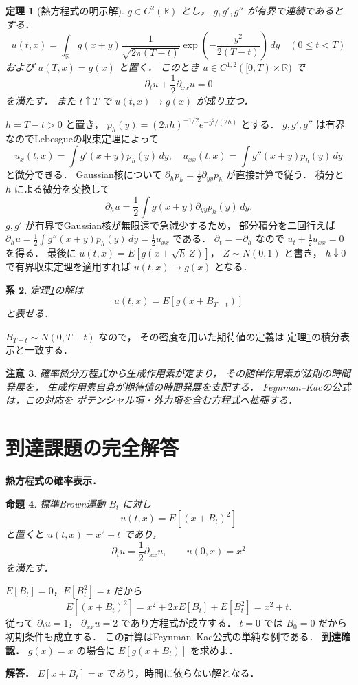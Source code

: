 \documentclass[a5paper,10pt,onecolumn]{jsarticle}
\makeatletter
\theoremstyle{mathnotetheorem}
\newtheorem{theorem}{定理}[section]
\newtheorem{proposition}[theorem]{命題}
\newtheorem{corollary}[theorem]{系}
\newtheorem{remark}[theorem]{注意}
\renewcommand{\proofname}{証明}
\renewenvironment{proof}[1][\proofname]{%
  \par\pushQED{\qed}\normalfont\topsep4\p@\@plus2\p@\relax
  \trivlist\item[\hskip\labelsep\bfseries #1]\ignorespaces
}{\popQED\endtrivlist\@endpefalse}
\makeatother
\begin{document}
\begin{theorem}[熱方程式の明示解]\label{thm:heat}
$g\in C^2(\mathbb R)$ とし，
$g,g',g''$ が有界で連続であるとする．
\[
 u(t,x)=\int_{\mathbb R}
 g(x+y)\frac{1}{\sqrt{2\pi(T-t)}}
 \exp\!\left(-\frac{y^2}{2(T-t)}\right)\,dy
 \quad(0\le t<T)
\]
および $u(T,x)=g(x)$ と置く．
このとき $u\in C^{1,2}([0,T)\times\mathbb R)$ で
\[
 \partial_tu+\frac12\partial_{xx}u=0
\]
を満たす．
また $t\uparrow T$ で $u(t,x)\to g(x)$ が成り立つ．
\end{theorem}
\begin{proof}
$h=T-t>0$ と置き，
$p_h(y)=(2\pi h)^{-1/2}e^{-y^2/(2h)}$ とする．
$g,g',g''$ は有界なのでLebesgueの収束定理によって
\[
 u_x(t,x)=\int g'(x+y)p_h(y)\,dy,\quad
 u_{xx}(t,x)=\int g''(x+y)p_h(y)\,dy
\]
と微分できる．
Gaussian核について
$\partial_hp_h=\frac12\partial_{yy}p_h$ が直接計算で従う．
積分と $h$ による微分を交換して
\[
 \partial_hu
 =\frac12\int g(x+y)\partial_{yy}p_h(y)\,dy.
\]
$g,g'$ が有界でGaussian核が無限遠で急減少するため，
部分積分を二回行えば
$\partial_hu=\frac12\int g''(x+y)p_h(y)\,dy
=\frac12u_{xx}$ である．
$\partial_t=-\partial_h$ なので
$u_t+\frac12u_{xx}=0$ を得る．
最後に $u(t,x)=E[g(x+\sqrt h\,Z)]$，
$Z\sim N(0,1)$ と書き，
$h\downarrow0$ で有界収束定理を適用すれば
$u(t,x)\to g(x)$ となる．
\end{proof}

\begin{corollary}
定理\ref{thm:heat}の解は
\[
 u(t,x)=E[g(x+B_{T-t})]
\]
と表せる．
\end{corollary}
\begin{proof}
$B_{T-t}\sim N(0,T-t)$ なので，
その密度を用いた期待値の定義は
定理\ref{thm:heat}の積分表示と一致する．
\end{proof}

\begin{remark}
確率微分方程式から生成作用素が定まり，
その随伴作用素が法則の時間発展を，
生成作用素自身が期待値の時間発展を支配する．
Feynman--Kacの公式は，この対応を
ポテンシャル項・外力項を含む方程式へ拡張する．
\end{remark}

\section{到達課題の完全解答}
\noindent\textbf{熱方程式の確率表示．}
\begin{proposition}
標準Brown運動 $B_t$ に対し
\[
u(t,x)=E[(x+B_t)^2]
\]
と置くと $u(t,x)=x^2+t$ であり，
\[
\partial_tu=\frac12\partial_{xx}u,\qquad
u(0,x)=x^2
\]
を満たす．
\end{proposition}
\begin{proof}
$E[B_t]=0$，$E[B_t^2]=t$ だから
\[
E[(x+B_t)^2]=x^2+2xE[B_t]+E[B_t^2]=x^2+t.
\]
従って $\partial_tu=1$，
$\partial_{xx}u=2$ であり方程式が成立する．
$t=0$ では $B_0=0$ だから初期条件も成立する．
この計算はFeynman--Kac公式の単純な例である．
\end{proof}
\noindent\textbf{到達確認．}
$g(x)=x$ の場合に $E[g(x+B_t)]$ を求めよ．
\par\noindent\textbf{解答．}
$E[x+B_t]=x$ であり，時間に依らない解となる．
\end{document}
